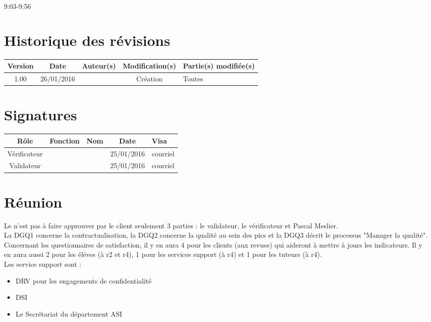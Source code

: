 \documentclass [a4paper] {article}
\begin{document}
\rhead{}
\hfill   
\hfill 	9:03-9:56 				%



\section*{Historique des révisions}
\begin{center}
			\begin{tabular}{| c | c | c | c | p{4cm} |}
				\hline
				\rowcolor{Gray}
				Version & Date & Auteur(s) & Modification(s) & Partie(s) modifiée(s)		 \\
				\hline
				1.00 & 26/01/2016 & \Pierre & Création & Toutes \\
		\hline		
			\end{tabular}
		\end{center}

\section*{Signatures}

		\begin{center}
			\begin{tabular}{| c | c | c | c | p{4cm} |}
				\hline
				\rowcolor{Gray}
				Rôle & Fonction & Nom & Date & Visa		 \\
				\hline
				Vérificateur & \RQA & \Kafui & 25/01/2016 & courriel \\[30pt]
				\hline
				Validateur & \CP & \Sergi & 25/01/2016 & courriel \\[30pt]	
				\hline
			\end{tabular}
		\end{center}


\section{Réunion}
Le \PQ{} n'est pas à faire approuver par le client seulement 3 parties : le validateur, le vérificateur et Pascal Meslier.
\\
La DGQ1 concerne la contractualisation, la DGQ2 concerne la qualité au sein des pics et la DGQ3 décrit le processus "Manager la qualité".
\\
Concernant les questionnaires de satisfaction, il y en aura 4 pour les clients (aux revues) qui aideront à mettre à jours les indicateurs. Il y en aura aussi 2 pour les élèves (à r2 et r4), 1 pour les services support (à r4) et 1 pour les tuteurs (à r4).
\\
Les service support sont : 
\begin{itemize}
\item DRV pour les engagements de confidentialité
\item DSI
\item Le Secrétariat du département ASI
\end{itemize}
\end{document}
